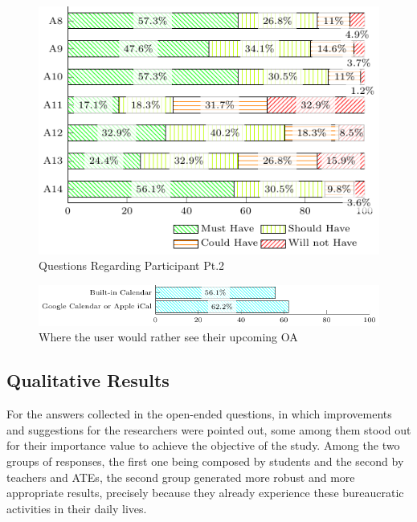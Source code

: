 \begin{figure}[!htb]
  \caption{Questions Regarding Participant Pt.2}\label{fig:participant-2}
  \begin{center}
    \includegraphics[width=.7\textwidth]{img/5-questions-participant-2.pdf}
  \end{center}
\end{figure}

\begin{figure}[!htb]
  \caption{Where the user would rather see their upcoming \ac{OA}} \label{fig:participant-A14}
  \begin{center}
    \includegraphics[width=\textwidth]{img/5-questions-participant-A14-1.pdf}
  \end{center}
\end{figure}

\subsection{Qualitative Results} \label{sec:qualitative-results}%

For the answers collected in the open-ended questions, in which improvements and suggestions for the researchers were pointed out, some among them stood out for their importance value to achieve the objective of the study. Among the two groups of responses, the first one being composed by students and the second by teachers and \acp{ATE}, the second group generated more robust and more appropriate results, precisely because they already experience these bureaucratic activities in their daily lives.

